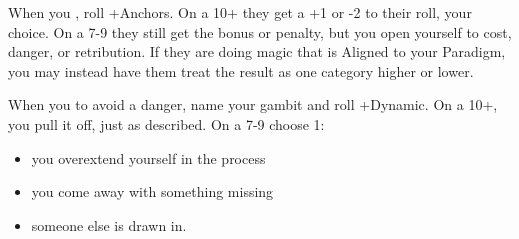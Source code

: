 \begin{multicols}{3}
\begin{move}
  \end{move}

  \SEPARATOR

  \begin{move}
    When you  , roll +Anchors. On a 10+ they get a +1 or -2 to their roll, your choice. On a 7-9 they still get the bonus or penalty, but you open yourself to cost, danger, or retribution. If they are doing magic that is Aligned to your Paradigm, you may instead have them treat the result as one category higher or lower.

  \end{move}

  \columnbreak
    
  \begin{move}
     \TRIGGER{}

  \end{move}

  \vspace{1em}
  
  \SEPARATOR

  \begin{move}
    When you   to avoid a danger, name your gambit and roll +Dynamic. On a 10+, you pull it off, just as described. On a 7-9 choose 1:

    \begin{itemize}
      \setlength\itemsep{0em}
    \item you overextend yourself in the process
    \item you come away with something missing
    \item someone else is drawn in.
    \end{itemize}
  \end{move}

  \SEPARATOR

  \begin{move}
     \TRIGGER{}
    \begin{itemize}
      \setlength\itemsep{0em}
    \end{itemize}
  \end{move}

  \SEPARATOR

  \begin{move}
     \TRIGGER{}
    \begin{itemize}
      \setlength\itemsep{0em}
    \end{itemize}

  \end{move}


\end{multicols}
